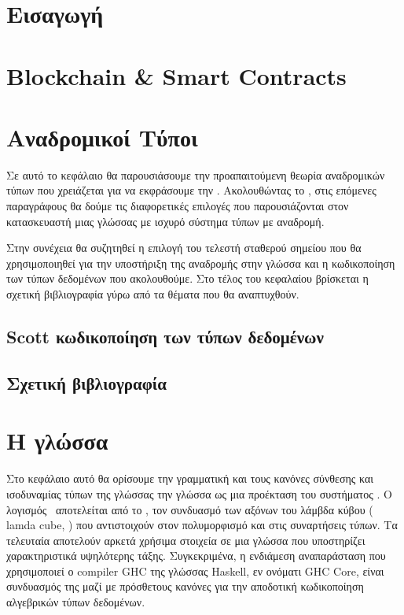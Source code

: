 \documentclass[diploma]{softlab-thesis}
\begin{document}
\tableofcontents
\listoffigures



\mainmatter

\chapter{Εισαγωγή}
\label{chap:chapter1}


\chapter{Blockchain \& Smart Contracts}
\label{chap:chapter2}


\chapter{Αναδρομικοί Τύποι}
\label{chap:chapter3}
%
Σε αυτό το κεφάλαιο θα παρουσιάσουμε την προαπαιτούμενη θεωρία αναδρομικών
τύπων που χρειάζεται για να εκφράσουμε την \FOMF. Ακολουθώντας το \cite{tapl}, στις
επόμενες παραγράφους θα δούμε τις διαφορετικές επιλογές που παρουσιάζονται στον
κατασκευαστή μιας γλώσσας με ισχυρό σύστημα τύπων με αναδρομή.

Στην συνέχεια θα συζητηθεί η επιλογή του τελεστή σταθερού σημείου που θα χρησιμοποιηθεί
για την υποστήριξη της αναδρομής στην γλώσσα και η κωδικοποίηση των τύπων δεδομένων
που ακολουθούμε. Στο τέλος του κεφαλαίου βρίσκεται η σχετική βιβλιογραφία γύρω από τα
θέματα που θα αναπτυχθούν.



\section{Scott κωδικοποίηση των τύπων δεδομένων}
\label{sec:data-encoding}


\section{Σχετική βιβλιογραφία}


\chapter{Η γλώσσα \FIR{}}
\label{chap:chapter4}
%
Στο κεφάλαιο αυτό θα ορίσουμε την γραμματική και τους κανόνες σύνθεσης και ισοδυναμίας τύπων
της γλώσσας την γλώσσα \FIR{} ως μια προέκταση του συστήματος \FOMF. Ο λογισμός \FOMF
~αποτελείται από το \FOM , τον συνδυασμό των αξόνων του λάμβδα κύβου ( lamda cube, \cite{lambdacube} )
που αντιστοιχούν στον πολυμορφισμό και στις συναρτήσεις τύπων. Τα τελευταία αποτελούν αρκετά
χρήσιμα στοιχεία σε μια γλώσσα που υποστηρίζει χαρακτηριστικά υψηλότερης τάξης. Συγκεκριμένα,
η ενδιάμεση αναπαράσταση που χρησιμοποιεί ο compiler GHC της γλώσσας Haskell, εν ονόματι GHC Core,
είναι συνδυασμός της \FOM μαζί με πρόσθετους κανόνες για την αποδοτική κωδικοποίηση αλγεβρικών
τύπων δεδομένων.
\end{document}
